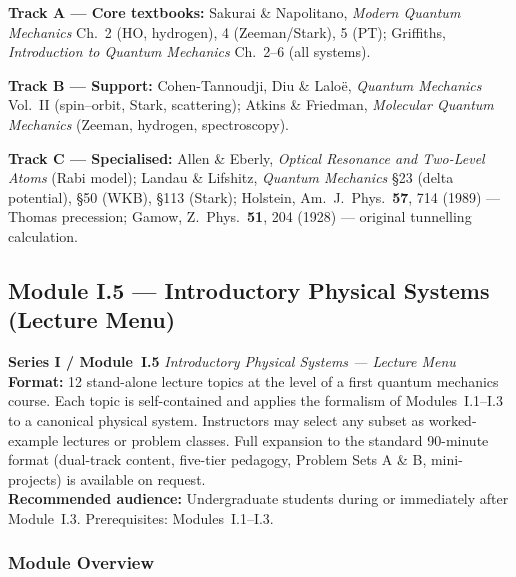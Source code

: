 \documentclass[11pt,a4paper]{article}
\begin{document}
\noindent\textbf{Track A --- Core textbooks:}
Sakurai \& Napolitano, \textit{Modern Quantum Mechanics} Ch.~2 (HO, hydrogen), 4 (Zeeman/Stark), 5 (PT);
Griffiths, \textit{Introduction to Quantum Mechanics} Ch.~2--6 (all systems).

\noindent\textbf{Track B --- Support:}
Cohen-Tannoudji, Diu \& Lalo\"e, \textit{Quantum Mechanics} Vol.~II (spin--orbit, Stark, scattering);
Atkins \& Friedman, \textit{Molecular Quantum Mechanics} (Zeeman, hydrogen, spectroscopy).

\noindent\textbf{Track C --- Specialised:}
Allen \& Eberly, \textit{Optical Resonance and Two-Level Atoms} (Rabi model);
Landau \& Lifshitz, \textit{Quantum Mechanics} \S{}23 (delta potential), \S{}50 (WKB), \S{}113 (Stark);
Holstein, Am.\ J.\ Phys.\ \textbf{57}, 714 (1989) --- Thomas precession;
Gamow, Z.\ Phys.\ \textbf{51}, 204 (1928) --- original tunnelling calculation.

\newpage


\subsection{Module I.5 --- Introductory Physical Systems (Lecture Menu)}
\label{sec:mod-I5}

\begin{tcolorbox}[seriesbox]
  \textbf{Series I / Module~I.5} \quad
  \textit{Introductory Physical Systems --- Lecture Menu}\\[4pt]
  \textbf{Format:} 12 stand-alone lecture topics at the level of a first
  quantum mechanics course. Each topic is self-contained and applies the
  formalism of Modules~I.1--I.3 to a canonical physical system.
  Instructors may select any subset as worked-example lectures or problem
  classes. Full expansion to the standard 90-minute format (dual-track
  content, five-tier pedagogy, Problem Sets A \& B, mini-projects) is
  available on request.\\[4pt]
  \textbf{Recommended audience:} Undergraduate students during or
  immediately after Module~I.3. Prerequisites: Modules~I.1--I.3.
\end{tcolorbox}

\medskip

\subsubsection*{Module Overview}
\end{document}
